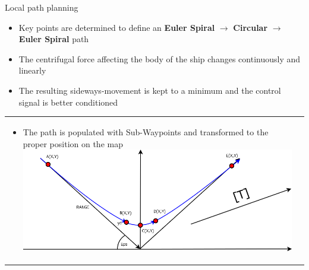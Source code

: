 \begin{frame}{Local path planning}
		\begin{itemize}
			\item Key points are determined to define an \textbf{Euler Spiral} $\rightarrow$ \textbf{Circular} $\rightarrow$ \textbf{Euler Spiral} path
			\item The centrifugal force affecting the body of the ship changes continuously and linearly
			\item The resulting sideways-movement is kept to a minimum and the control signal is better conditioned
		\end{itemize}
			\begin{tabular}{l l}
			\hspace{-3.1mm}
				\begin{minipage}{0.6\textwidth}
					\begin{itemize}
						\vspace{-2.5mm}
						\item The path is populated with Sub-Waypoints and transformed to the proper position on the map 
						\includegraphics[width = \textwidth]{control/img/positioning1}
					\end{itemize}
				\end{minipage}
			&
				\begin{minipage}{0.3\textwidth}

\end{minipage}
\end{tabular}
\end{frame}
